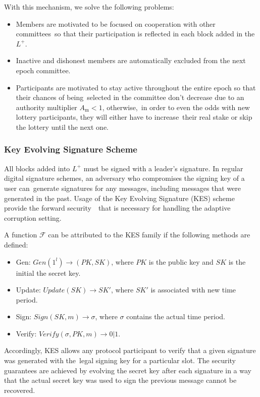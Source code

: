 With this mechanism, we solve the following problems:
\begin{itemize}
    \item Members are motivated to be focused on cooperation with other committees\
    so that their participation is reflected in each block added in the $L^+$.
    \item Inactive and dishonest members are automatically excluded from the next epoch committee.
    \item Participants are motivated to stay active throughout the entire epoch so that their chances of being\
    selected in the committee don't decrease due to an authority multiplier ${A_{\text{m}} < 1}$, otherwise,\
    in order to even the odds with new lottery participants, they will either have to increase\
    their real stake or skip the lottery until the next one.
\end{itemize}

\subsubsection{Key Evolving Signature Scheme}\label{subsubsec:kes}
All blocks added into $L^+$ must be signed with a leader's signature.
In regular digital signature schemes, an adversary who compromises the signing key of a user can\
generate signatures for any messages, including messages that were generated in the past.
Usage of the Key Evolving Signature (KES) scheme provide the forward security~\cite{cryptoeprint:2001/034}\
that is necessary for handling the adaptive corruption setting.

A function $\mathcal{F}$ can be attributed to the KES family if the following methods are defined:
\begin{itemize}
    \item Gen: ${Gen(1^l) \rightarrow (PK, SK)}$, where $PK$ is the public key and $SK$ is the initial the secret key.
    \item Update:  ${Update(SK) \rightarrow SK'}$, where $SK'$ is associated with new time period.
    \item Sign: ${Sign(SK, m) \rightarrow \sigma}$, where $\sigma$ contains the actual time period.
    \item Verify:  ${Verify(\sigma, PK, m) \rightarrow 0 | 1}$.
\end{itemize}
Accordingly, KES allows any protocol participant to verify that a given signature was generated with the\
legal signing key for a particular slot.
The security guarantees are achieved by evolving the secret key after each signature
in a way that the actual secret key was used to sign the previous message
cannot be recovered.

